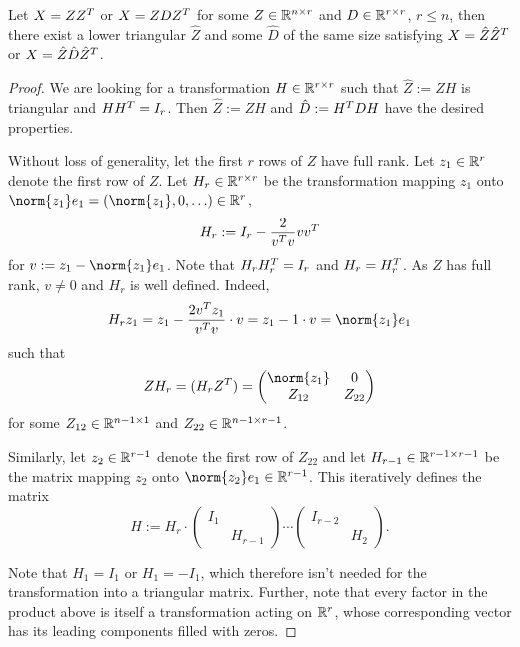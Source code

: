 \begin{proposition}
  Let $X=ZZ^T$ or $X=ZDZ^T$ for some $Z\in\mathbb{R}^{n\times r}$ and $D\in\mathbb{R}^{r\times r}$,
  $r \leq n$,
  then there exist a lower triangular $\hat{Z}$
  and some $\hat D$ of the same size satisfying
  $X=\hat Z \hat Z^T$
  or $X=\hat Z \hat D \hat Z^T$.
\end{proposition}
\begin{proof}
  We are looking for a transformation $H\in\mathbb{R}^{r\times r}$ such that $\hat Z := ZH$ is triangular and $HH^T = I_r$.
  Then $\hat Z := ZH$ and $\hat D := H^T DH$ have the desired properties.

  Without loss of generality, let the first $r$ rows of $Z$ have full rank.
  Let $z_1\in\mathbb{R}^r$ denote the first row of $Z$.
  Let $H_r\in\mathbb{R}^{r\times r}$ be the \Householder transformation mapping
  $z_1$ onto $\norm{z_1}e_1 = (\norm{z_1},0,\ldots) \in \R^r$, \ie
  \begin{equation}
    H_r := I_r - \frac{2}{v^T v} vv^T
  \end{equation}
  for $v := z_1 - \norm{z_1}e_1$.
  Note that $H_r H_r^T = I_r$ and $H_r = H_r^T$.
  As $Z$ has full rank, $v \neq 0$ and $H_r$ is well defined.
  Indeed,
  \begin{equation*}
    H_r z_1
    = z_1 - \frac{2v^\T z_1}{v^\T v} \cdot v
    = z_1 - 1 \cdot v
    = \norm{z_1}e_1
  \end{equation*}
  such that
  \begin{equation}
    Z H_r = (H_r Z^\T) = \begin{pmatrix}
      \norm{z_1} & 0 \\
      Z_{12} & Z_{22}
    \end{pmatrix}
  \end{equation}
  for some $Z_{12} \in \mathbb{R}^{n-1 \times 1}$ and $Z_{22} \in \mathbb{R}^{n-1 \times r-1}$.

  Similarly, let $z_2\in\mathbb{R}^{r-1}$ denote the first row of $Z_{22}$ and
  let $H_{r-1} \in \mathbb{R}^{r-1 \times r-1}$ be the \Householder matrix mapping
  $z_2$ onto $\norm{z_2}e_1 \in\R^{r-1}$.
  This iteratively defines the matrix
  \begin{equation}
    H :=
    H_r \cdot
    \begin{pmatrix}
      I_1 \\ & H_{r-1}
    \end{pmatrix}
    \cdots
    \begin{pmatrix}
      I_{r-2} \\ & H_2
    \end{pmatrix}
    .
  \end{equation}

  Note that $H_1 = I_1$ or $H_1 = -I_1$,
  which therefore isn't needed for the transformation into a triangular matrix.
  Further, note that every factor in the product above is itself a \Householder transformation acting on $\mathbb{R}^r$,
  whose corresponding vector has its leading components filled with zeros.
\end{proof}

